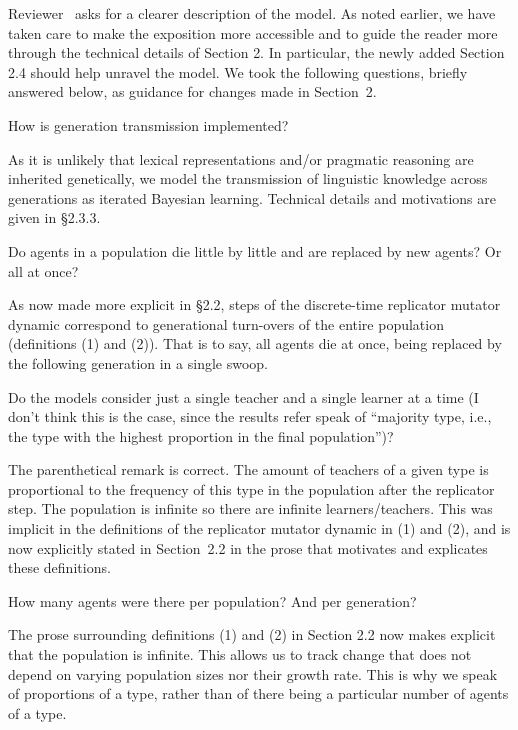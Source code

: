 \documentclass[12pt,a4paper]{article}
\begin{document}
\noindent Reviewer \thereviewerCounter~asks for a clearer description of the model. As noted earlier, we have taken care to make the exposition more accessible and to guide the reader more through the technical details of Section 2. In particular, the newly added Section 2.4 should help unravel the model. We took the following questions, briefly answered below, as guidance for changes made in Section~2.

\vspace{.5cm}
\begin{mdframed}[backgroundcolor=gray!25,linecolor=gray!25]
How is generation transmission implemented?
\end{mdframed}
As it is unlikely that lexical representations and/or pragmatic reasoning are inherited genetically, we model the transmission of linguistic knowledge across generations as  iterated Bayesian learning. Technical details and motivations are given in \S 2.3.3.

\vspace{.5cm}
\begin{mdframed}[backgroundcolor=gray!25,linecolor=gray!25]
Do agents in a population die little by little and are replaced by new agents? Or all at once?
\end{mdframed}
As now made more explicit in \S2.2, steps of the discrete-time replicator mutator dynamic correspond to generational turn-overs of the entire population (definitions (1) and (2)). That is to say, all agents die at once, being replaced by the following generation in a single swoop. 

\vspace{.5cm}
\begin{mdframed}[backgroundcolor=gray!25,linecolor=gray!25]
Do the models consider just a single teacher and a single learner at a time (I don't think this is the case, since the results refer speak of ``majority type, i.e., the type with the highest proportion in the final population'')?
\end{mdframed}
The parenthetical remark is correct. The amount of teachers of a given type is proportional to the frequency of this type in the population after the replicator step. The population is infinite so there are infinite learners/teachers. This was implicit in the definitions of the replicator mutator dynamic in (1) and (2), and is now explicitly stated in Section~2.2 in the prose that motivates and explicates these definitions.

\vspace{.5cm}
\begin{mdframed}[backgroundcolor=gray!25,linecolor=gray!25]
 How many agents were there per population? And per generation?
\end{mdframed}
The prose surrounding definitions (1) and (2) in Section 2.2 now makes explicit that the population is infinite. This allows us to track change that does not depend on varying population sizes nor their growth rate. This is why we speak of proportions of a type, rather than of there being a particular number of agents of a type. 
\end{document}
